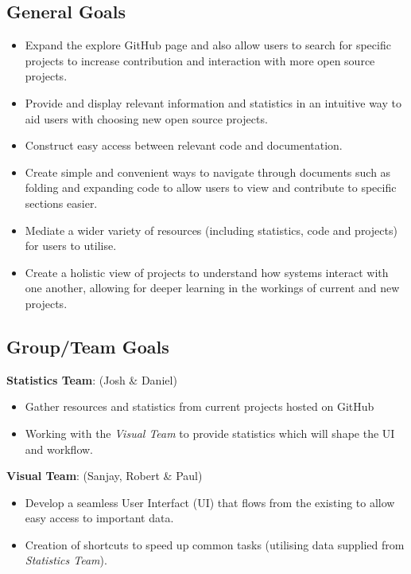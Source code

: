 \documentclass[12pt]{article}
\begin{document}
\subsection{General Goals}
\begin{itemize}
\item Expand the explore GitHub page and also allow users to search for specific projects to increase contribution and interaction with more open source projects.
\item Provide and display relevant information and statistics in an intuitive way to aid users with choosing new open source projects.
\item Construct easy access between relevant code and documentation.
\item Create simple and convenient ways to navigate through documents such as folding and expanding code to allow users to view and contribute to specific sections easier.
\item Mediate a wider variety of resources (including statistics, code and projects) for users to utilise.
\item Create a holistic view of projects to understand how systems interact with one another, allowing for deeper learning in the workings of current and new projects.
\end{itemize}
\subsection{Group/Team Goals}
\textbf{Statistics Team}: (Josh \& Daniel)
\begin{itemize}
\item Gather resources and statistics from current projects hosted on GitHub
\item Working with the \emph{Visual Team} to provide statistics which will shape the UI and workflow.
\end{itemize}
\textbf{Visual Team}: (Sanjay, Robert \& Paul)
\begin{itemize}
\item Develop a seamless User Interfact (UI) that flows from the existing to allow easy access to important data.
\item Creation of shortcuts to speed up common tasks (utilising data supplied from \emph{Statistics Team}).
\end{itemize}
\end{document}
